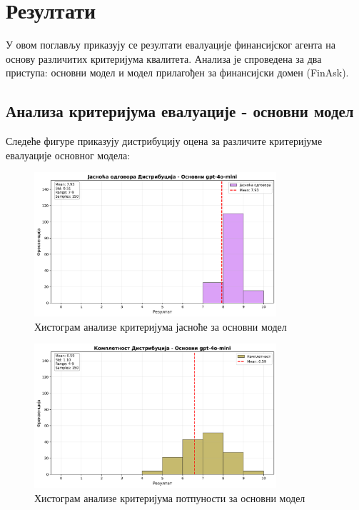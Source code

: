 \chapter{Резултати}
\label{sec:rezultati}

У овом поглављу приказују се резултати евалуације финансијског агента на основу различитих критеријума квалитета. Анализа је спроведена за два приступа: основни модел и модел прилагођен за финансијски домен (FinAsk).

\section{Анализа критеријума евалуације - основни модел}

Следеће фигуре приказују дистрибуцију оцена за различите критеријуме евалуације основног модела:

\begin{figure}[h]
    \centering
    \includegraphics[width=0.8\textwidth]{images/osnovni/criteria_analysis_clarity_histogram.png}
    \caption{Хистограм анализе критеријума јасноће за основни модел}
    \label{fig:osnovni_clarity}
\end{figure}

\begin{figure}[h]
    \centering
    \includegraphics[width=0.8\textwidth]{images/osnovni/criteria_analysis_completeness_histogram.png}
    \caption{Хистограм анализе критеријума потпуности за основни модел}
    \label{fig:osnovni_completeness}
\end{figure}

